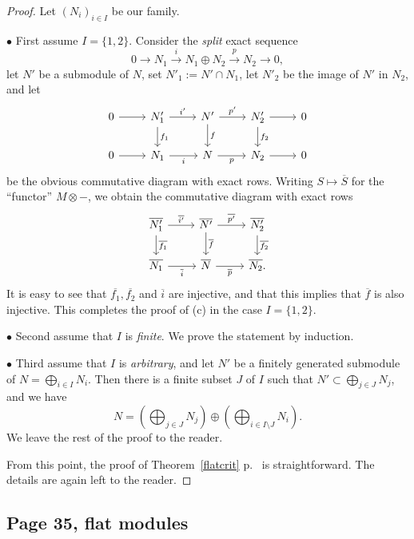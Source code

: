 \documentclass[parskip=half,fontsize=12pt]{scrartcl}%
\newcommand{\mf}{\mathfrak}
\newcommand{\aaa}{\mf a}
\newcommand{\bu}{\bullet}
\begin{document}
\begin{proof} 
Let $(N_i)_{i\in I}$ be our family. 

$\bu$ First assume $I=\{1,2\}$. 
Consider the \emph{split} exact sequence 
$$
0\to N_1\xrightarrow i N_1\oplus N_2\xrightarrow pN_2\to0,
$$ 
let $N'$ be a submodule of $N$, set $N'_1:=N'\cap N_1$, let $N'_2$ be the image of $N'$ in $N_2$, and let 
$$
\begin{tikzcd}
0\ar[r]&N'_1\ar[d,"f_1"]\ar[r,"i'"]&N'\ar[d,"f"]\ar[r,"p'"]&N'_2\ar[d,"f_2"]\ar[r]&0\\ 
0\ar[r]&N_1\ar[r,"i"']&N\ar[r,"p"']&N_2\ar[r]&0
\end{tikzcd}
$$  
be the obvious commutative diagram with exact rows. Writing $S\mapsto\overline S$ for the ``functor'' $M\otimes-$, we obtain the commutative diagram with exact rows
$$
\begin{tikzcd}
\overline{N'_1}\ar[d,"\overline{f_1}"]\ar[r,"\overline{i'}"]&\overline{N'}\ar[d,"\overline f"]\ar[r,"\overline{p'}"]& \overline{N'_2}\ar[d,"\overline{f_2}"]\\ 
\overline{N_1}\ar[r,"\overline i"']&\overline N\ar[r,"\overline p"']& \overline{N_2}.
\end{tikzcd}
$$ 
It is easy to see that $\overline{f_1},\overline{f_2}$ and $\overline i$ are injective, and that this implies that $\overline f$ is also injective. This completes the proof of (c) in the case $I=\{1,2\}$.

$\bu$ Second assume that $I$ is \emph{finite}. We prove the statement by induction.

$\bu$ Third assume that $I$ is \emph{arbitrary}, and let $N'$ be a finitely generated submodule of $N=\bigoplus_{i\in I}N_i$. Then there is a finite subset $J$ of $I$ such that $N'\subset\bigoplus_{j\in J}N_j$, and we have 
$$
N=\left(\bigoplus_{j\in J}N_j\right)\oplus\left(\bigoplus_{i\in I\setminus J}N_i\right). 
$$ 
We leave the rest of the proof to the reader.


From this point, the proof of Theorem~\ref{flatcrit} p.~\pageref{flatcrit} is straightforward. The details are again left to the reader.

\end{proof}

\subsection{Page 35, flat modules}%
\end{document}
